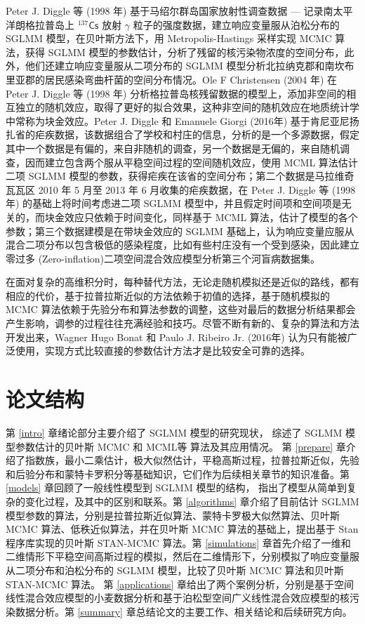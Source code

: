 \documentclass[12pt,a4paper,UTF8,twoside]{book}
\theoremstyle{definition}
\theoremstyle{definition}
\theoremstyle{definition}
\theoremstyle{remark}
\begin{document}
Peter J. Diggle 等 (1998 年) 基于马绍尔群岛国家放射性调查数据 ---
记录南太平洋朗格拉普岛上 \({}^{137}\mathsf{Cs}\) 放射 \(\gamma\)
粒子的强度数据，建立响应变量服从泊松分布的 SGLMM
模型，在贝叶斯方法下，用 Metropolis-Hastings 采样实现 MCMC 算法，获得
SGLMM
模型的参数估计，分析了残留的核污染物浓度的空间分布，此外，他们还建立响应变量服从二项分布的
SGLMM
模型分析北拉纳克郡和南坎布里亚郡的居民感染弯曲杆菌的空间分布情况。Ole F
Christensen (2004 年) \citep{Christensen2004} 在 Peter J. Diggle 等
(1998 年) \citep{Diggle1998}
分析格拉普岛核残留数据的模型上，添加非空间的相互独立的随机效应，取得了更好的拟合效果，这种非空间的随机效应在地质统计学中常称为块金效应。Peter
J. Diggle 和 Emanuele Giorgi (2016年) \citep{Diggle2016}
基于肯尼亚尼扬扎省的疟疾数据，该数据组合了学校和村庄的信息，分析的是一个多源数据，假定其中一个数据是有偏的，来自非随机的调查，另一个数据是无偏的，来自随机调查，因而建立包含两个服从平稳空间过程的空间随机效应，使用
MCML 算法估计二项 SGLMM
模型的参数，获得疟疾在该省的空间分布；第二个数据是马拉维奇瓦瓦区 2010 年
5 月至 2013 年 6 月收集的疟疾数据，在 Peter J. Diggle 等 (1998 年)
的基础上将时间考虑进二项 SGLMM
模型中，并且假定时间项和空间项是无关的，而块金效应只依赖于时间变化，同样基于
MCML 算法，估计了模型的各个参数；第三个数据建模是在带块金效应的 SGLMM
基础上，认为响应变量应服从混合二项分布以包含极低的感染程度，比如有些村庄没有一个受到感染，因此建立零过多
(Zero-inflation)二项空间混合效应模型分析第三个河盲病数据集。

在面对复杂的高维积分时，每种替代方法，无论走随机模拟还是近似的路线，都有相应的代价，基于拉普拉斯近似的方法依赖于初值的选择，基于随机模拟的
MCMC
算法依赖于先验分布和算法参数的调整，这些对最后的数据分析结果都会产生影响，调参的过程往往充满经验和技巧。尽管不断有新的、复杂的算法和方法开发出来，Wagner
Hugo Bonat 和 Paulo J. Ribeiro Jr. (2016年) \citep{Bonat2016Practical}
认为只有能被广泛使用，实现方式比较直接的参数估计方法才是比较安全可靠的选择。

\hypertarget{stracture}{%
\section{论文结构}\label{stracture}}

第 \ref{intro} 章绪论部分主要介绍了 SGLMM 模型的研究现状， 综述了 SGLMM
模型参数估计的贝叶斯 MCMC 和 MCML等 算法及其应用情况。 第 \ref{prepare}
章介绍了指数族，最小二乘估计，极大似然估计，平稳高斯过程，拉普拉斯近似，先验和后验分布和蒙特卡罗积分等基础知识，它们作为后续相关章节的知识准备。第
\ref{models} 章回顾了一般线性模型到 SGLMM 模型的结构，
指出了模型从简单到复杂的变化过程，及其中的区别和联系。第
\ref{algorithms} 章介绍了目前估计 SGLMM
模型参数的算法，分别是拉普拉斯近似算法、蒙特卡罗极大似然算法、贝叶斯
MCMC 算法、低秩近似算法，并在贝叶斯 MCMC 算法的基础上，提出基于 Stan
程序库实现的贝叶斯 STAN-MCMC 算法。第 \ref{simulations}
章首先介绍了一维和二维情形下平稳空间高斯过程的模拟，然后在二维情形下，分别模拟了响应变量服从二项分布和泊松分布的
SGLMM 模型，比较了贝叶斯 MCMC 算法和贝叶斯 STAN-MCMC 算法。 第
\ref{applications}
章给出了两个案例分析，分别是基于空间线性混合效应模型的小麦数据分析和基于泊松型空间广义线性混合效应模型的核污染数据分析。第
\ref{summary} 章总结论文的主要工作、相关结论和后续研究方向。
\end{document}
